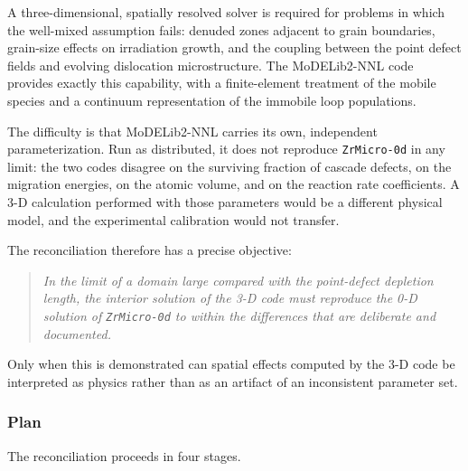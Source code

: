 \documentclass{article}
\newcommand{\MoD}{\textsf{MoDELib2-NNL}}
\newcommand{\ZrOd}{\texttt{ZrMicro-0d}}
\begin{document}
A three-dimensional, spatially resolved solver is required for problems in which
the well-mixed assumption fails: denuded zones adjacent to grain boundaries,
grain-size effects on irradiation growth, and the coupling between the point
defect fields and evolving dislocation microstructure. The \MoD{} code provides
exactly this capability, with a finite-element treatment of the mobile species
and a continuum representation of the immobile loop populations.

The difficulty is that \MoD{} carries its own, independent parameterization. Run
as distributed, it does not reproduce \ZrOd{} in any limit: the two codes disagree
on the surviving fraction of cascade defects, on the migration energies, on the
atomic volume, and on the reaction rate coefficients. A 3-D calculation performed
with those parameters would be a different physical model, and the experimental
calibration would not transfer.

The reconciliation therefore has a precise objective:

\begin{quote}
\emph{In the limit of a domain large compared with the point-defect depletion
length, the interior solution of the 3-D code must reproduce the 0-D solution of
\ZrOd{} to within the differences that are deliberate and documented.}
\end{quote}

Only when this is demonstrated can spatial effects computed by the 3-D code be
interpreted as physics rather than as an artifact of an inconsistent parameter
set.

\subsubsection{Plan}

The reconciliation proceeds in four stages.
\end{document}
